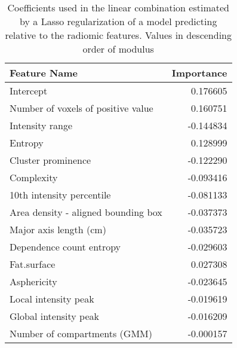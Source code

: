 \begin{table}
\caption{Coefficients used in the linear combination estimated by a Lasso regularization of a model predicting \icu relative to the radiomic features. Values in descending order of modulus \label{tab:ParamRadICU}}
\centering 
	\begin{tabular}{lr}
	\toprule
	Feature Name &   Importance \\
	\midrule
	Intercept                           &                      0.176605 \\
	Number of voxels of positive value  &                      0.160751 \\
	Intensity range                     &                     -0.144834 \\
	Entropy                             &                      0.128999 \\
	Cluster prominence                  &                     -0.122290 \\
	Complexity                          &                     -0.093416 \\
	10th intensity percentile           &                     -0.081133 \\
	Area density - aligned bounding box &                     -0.037373 \\
	Major axis length (cm)              &                     -0.035723 \\
	Dependence count entropy            &                     -0.029603 \\
	Fat.surface                         &                      0.027308 \\
	Asphericity                         &                     -0.023645 \\
	Local intensity peak                &                     -0.019619 \\
	Global intensity peak               &                     -0.016209 \\
	Number of compartments (GMM)        &                     -0.000157 \\
	\bottomrule
	\end{tabular}
\end{table}

